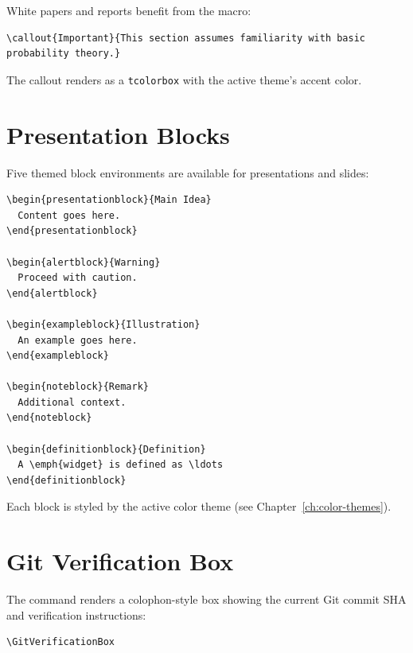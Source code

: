 White papers and reports benefit from the  macro:

\begin{verbatim}
\callout{Important}{This section assumes familiarity with basic
probability theory.}
\end{verbatim}

The callout renders as a \texttt{tcolorbox} with the active theme's accent
color.

\section{Presentation Blocks}

Five themed block environments are available for presentations and slides:

\begin{verbatim}
\begin{presentationblock}{Main Idea}
  Content goes here.
\end{presentationblock}

\begin{alertblock}{Warning}
  Proceed with caution.
\end{alertblock}

\begin{exampleblock}{Illustration}
  An example goes here.
\end{exampleblock}

\begin{noteblock}{Remark}
  Additional context.
\end{noteblock}

\begin{definitionblock}{Definition}
  A \emph{widget} is defined as \ldots
\end{definitionblock}
\end{verbatim}

Each block is styled by the active color theme (see
Chapter~\ref{ch:color-themes}).

\section{Git Verification Box}

The  command renders a colophon-style box showing the
current Git commit SHA and verification instructions:

\begin{verbatim}
\GitVerificationBox
\end{verbatim}

